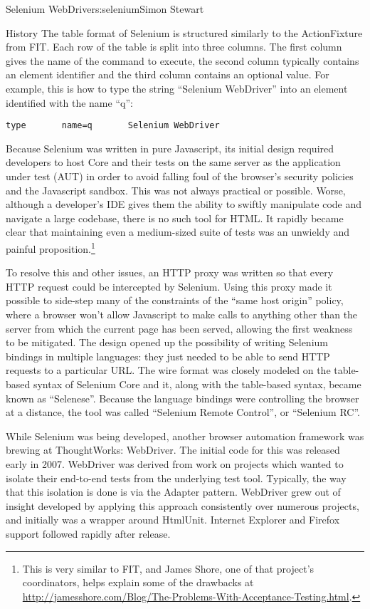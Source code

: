 \begin{aosachapter}{Selenium WebDriver}{s:selenium}{Simon Stewart}
\begin{aosasect1}{History}
The table format of Selenium is structured similarly to the
ActionFixture from FIT\@. Each row of the table is split into three
columns. The first column gives the name of the command to execute,
the second column typically contains an element identifier and the
third column contains an optional value. For example, this is how to
type the string ``Selenium WebDriver'' into an element identified with
the name ``q'':

\begin{verbatim}
type       name=q       Selenium WebDriver
\end{verbatim}

Because Selenium was written in pure Javascript,
its initial design required developers to host Core and
their tests on the same server as the application under test
(AUT) in order to avoid falling foul of the browser's security
policies and the Javascript sandbox. This was not always
practical or possible.  Worse, although a
developer's IDE gives them the ability to swiftly manipulate code and
navigate a large codebase, there is no such tool for HTML\@. It rapidly
became clear that maintaining even a medium-sized suite of tests was
an unwieldy and painful proposition.\footnote{This is very similar to
FIT, and James Shore, one of that project's coordinators, helps
explain some of the drawbacks at
\url{http://jamesshore.com/Blog/The-Problems-With-Acceptance-Testing.html}.}


To resolve this and other issues, an HTTP proxy was written so that
every HTTP request could be intercepted by Selenium. Using this
proxy made it possible to side-step many of the constraints of the ``same host
origin'' policy, where a browser won't allow Javascript to make calls
to anything other than the server from which the current page has been
served, allowing the first weakness to be mitigated. The design opened
up the possibility of writing Selenium bindings in multiple languages:
they just needed to be able to send HTTP requests to a particular
URL\@. The wire format was closely modeled on the table-based syntax of
Selenium Core and it, along with the table-based syntax, became
known as ``Selenese''. Because the language bindings were controlling
the browser at a distance, the tool was called ``Selenium Remote
Control'', or ``Selenium RC''.

While Selenium was being developed, another browser automation
framework was brewing at ThoughtWorks: WebDriver. The initial code for
this was released early in 2007. WebDriver was derived from work on
projects which wanted to isolate their end-to-end tests from the
underlying test tool.  Typically, the way that this isolation is done
is via the Adapter pattern.  WebDriver grew out of insight
developed by applying this approach consistently over numerous
projects, and initially was a wrapper around HtmlUnit. Internet
Explorer and Firefox support followed rapidly after release.


\end{aosasect1}
\end{aosachapter}

